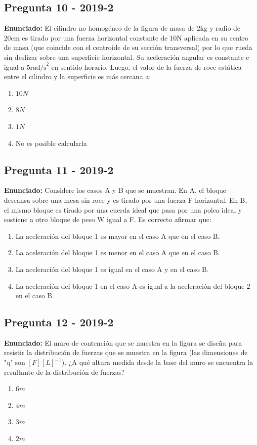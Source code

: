 \documentclass{article}
\begin{document}
\subsection*{Pregunta 10 - 2019-2}
\textbf{Enunciado:} El cilindro no homogéneo de la figura de masa de 2kg y radio de 20cm es tirado por una fuerza horizontal constante de 10N aplicada en su centro de masa (que coincide con el centroide de su sección transversal) por lo que rueda sin deslizar sobre una superficie horizontal. Su aceleración angular es constante e igual a $5\text{rad/s}^2$ en sentido horario. Luego, el valor de la fuerza de roce estática entre el cilindro y la superficie es más cercana a:
\begin{enumerate}
    \item[a)] $10 N$
    \item[b)] $8 N$
    \item[c)] $1 N$
    \item[d)] No es posible calcularla
\end{enumerate}
\vspace{0.5cm}

\subsection*{Pregunta 11 - 2019-2}
\textbf{Enunciado:} Considere los casos A y B que se muestran. En A, el bloque descansa sobre una mesa sin roce y es tirado por una fuerza F horizontal. En B, el mismo bloque es tirado por una cuerda ideal que pasa por una polea ideal y sostiene a otro bloque de peso W igual a F. Es correcto afirmar que:
\begin{enumerate}
    \item[a)] La aceleración del bloque 1 es mayor en el caso A que en el caso B.
    \item[b)] La aceleración del bloque 1 es menor en el caso A que en el caso B.
    \item[c)] La aceleración del bloque 1 es igual en el caso A y en el caso B.
    \item[d)] La aceleración del bloque 1 en el caso A es igual a la aceleración del bloque 2 en el caso B.
\end{enumerate}
\vspace{0.5cm}

\subsection*{Pregunta 12 - 2019-2}
\textbf{Enunciado:} El muro de contención que se muestra en la figura se diseña para resistir la distribución de fuerzas que se muestra en la figura (las dimensiones de "q" son $[F][L]^{-1}$). ¿A qué altura medida desde la base del muro se encuentra la resultante de la distribución de fuerzas?
\begin{enumerate}
    \item[a)] $6 m$
    \item[b)] $4 m$
    \item[c)] $3 m$
    \item[d)] $2 m$
\end{enumerate}
\vspace{0.5cm}
\end{document}
